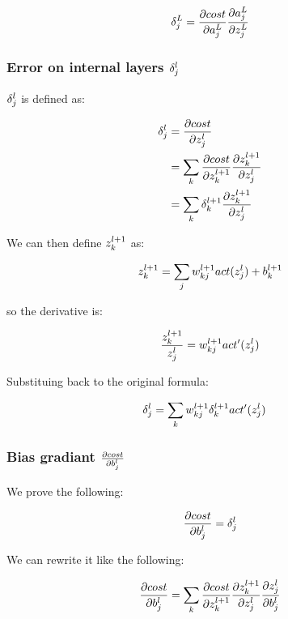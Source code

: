 \documentclass[a4paper]{article}
\begin{document}
\begin{align}
  \delta_{j}^{L} = \frac{\partial cost}{\partial a_{j}^{L}} \frac{\partial a_{j}^{L}}{\partial z_{j}^{L}}
\end{align}

\subsubsection{Error on internal layers $\delta_{j}^{l}$}

$\delta_{j}^{l}$ is defined as:

\begin{align}
  \delta_{j}^{l} &= \frac{\partial cost}{\partial z_{j}^{l}} \\
         &= \sum_{k}{\frac{\partial cost}{\partial z_{k}^{l+1}}\frac{\partial z_{k}^{l+1}}{\partial z_{j}^{l}}} \\
         &= \sum_{k}{\delta_{k}^{l+1}\frac{\partial z_{k}^{l+1}}{\partial z_{j}^{l}}}
\end{align}

We can then define $z_{k}^{l+1}$ as:

\begin{align}
  z_{k}^{l+1} = \sum_{j}{w_{kj}^{l+1}act(z_{j}^{l}) + b_{k}^{l+1}}
\end{align}

so the derivative is:

\begin{align}
  \frac{z_{k}^{l+1}}{z_{j}^{l}} = w_{kj}^{l+1}act'(z_{j}^{l})
\end{align}

Substituing back to the original formula:

\begin{align}
  \delta_{j}^{l} &= \sum_{k}{w_{kj}^{l+1} \delta_{k}^{l+1} act'(z_{j}^{l})}
\end{align}

\subsubsection{Bias gradiant $\frac{\partial cost}{\partial b_{j}^{l}}$}

We prove the following:

\begin{align}
  \frac{\partial cost}{\partial b_{j}^{l}} = \delta_{j}^{l}
\end{align}

We can rewrite it like the following:

\begin{align}
  \frac{\partial cost}{\partial b_{j}^{l}} =
    \sum_{k}{
      \frac{\partial cost}{\partial z_{k}^{l+1}}
      \frac{\partial z_{k}^{l+1}}{\partial z_{j}^{l}}
      \frac{\partial z_{j}^{l}}{\partial b_{j}^{l}}
    }
\end{align}
\end{document}

